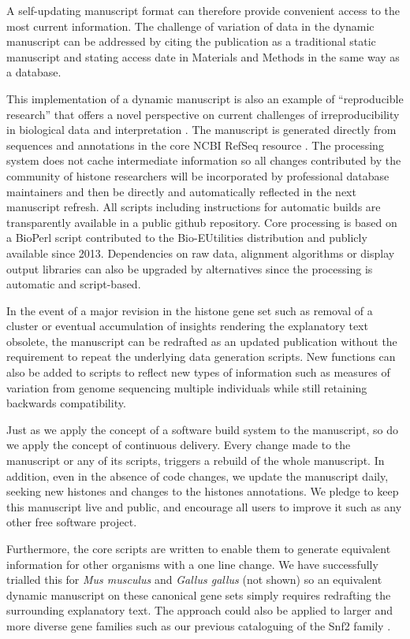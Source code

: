   A self-updating manuscript format can therefore provide
  convenient access to the most current information.
  The challenge of variation of data in the dynamic manuscript can be addressed
  by citing the publication as a traditional static manuscript
  and stating access date in Materials and Methods in the same way as a database.

  This implementation of a dynamic manuscript
  is also an example of ``reproducible research''
  \citep{reproducible-research-bioinformatics,reproducible-research-law}
  that offers a novel perspective on
  current challenges of irreproducibility in biological data
  and interpretation \citep{ErrorProne2012,OpenPrograms2012}.
  The manuscript is generated directly from sequences and annotations
  in the core NCBI RefSeq resource \citep{PruittRefseq2014}.
  The processing system does not cache intermediate information so all changes contributed by
  the community of histone researchers will be incorporated by professional database maintainers
  and then be directly and automatically reflected in the next manuscript refresh.
  All scripts including instructions for automatic builds
  are transparently available in a public github repository.
  Core processing is based on a BioPerl script contributed to the Bio-EUtilities distribution
  and publicly available since 2013.
  Dependencies on raw data, alignment algorithms or display output libraries
  can also be upgraded by alternatives since the processing is automatic and script-based.

  In the event of a major revision in the histone gene set such as removal of a cluster
  or eventual accumulation of insights rendering the explanatory text obsolete,
  the manuscript can be redrafted as an updated publication
  without the requirement to repeat the underlying data generation scripts.
  New functions can also be added to scripts to reflect new types of information
  such as measures of variation from genome sequencing multiple individuals
  while still retaining backwards compatibility.

  Just as we apply the concept of a software build system to the
  manuscript, so do we apply the concept of continuous delivery.
  Every change made to the manuscript or any of its scripts,
  triggers a rebuild of the whole manuscript.  In addition, even
  in the absence of code changes, we update the manuscript daily,
  seeking new histones and changes to the histones annotations.
  We pledge to keep this manuscript live and public, and encourage
  all users to improve it such as any other free software project.

  Furthermore, the core scripts are written to enable them to generate
  equivalent information for other organisms with a one line change.
  We have successfully trialled this for \textit{Mus musculus}
  and \textit{Gallus gallus} (not shown)
  so an equivalent dynamic manuscript on these canonical gene sets
  simply requires redrafting the surrounding explanatory text.
  The approach could also be applied to larger and more diverse gene families such as
  our previous cataloguing of the Snf2 family \citep{andrew-snf2-catalogue}.
